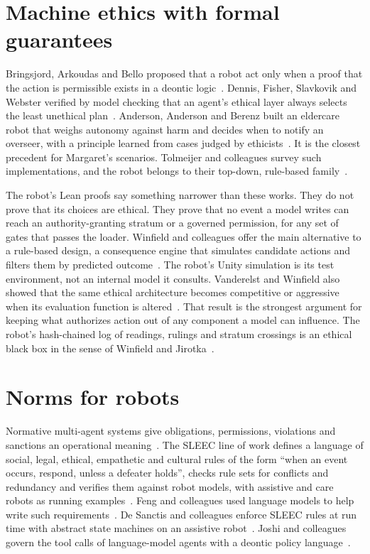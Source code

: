 \section{Machine ethics with formal guarantees}

Bringsjord, Arkoudas and Bello proposed that a robot act only when a proof that the action is
permissible exists in a deontic logic~\cite{bringsjord2006toward}. Dennis, Fisher, Slavkovik and
Webster verified by model checking that an agent's ethical layer always selects the least
unethical plan~\cite{dennis2016formal,dennis2016practical}. Anderson, Anderson and Berenz built an
eldercare robot that weighs autonomy against harm and decides when to notify an overseer, with a
principle learned from cases judged by ethicists~\cite{anderson2019eldercare}. It is the closest
precedent for Margaret's scenarios. Tolmeijer and colleagues survey such implementations, and the
robot belongs to their top-down, rule-based family~\cite{tolmeijer2021implementations}.

The robot's Lean proofs say something narrower than these works. They do not prove that its choices
are ethical. They prove that no event a model writes can reach an authority-granting stratum or a
governed permission, for any set of gates that passes the loader. Winfield and colleagues offer the
main alternative to a rule-based design, a consequence engine that simulates candidate actions and
filters them by predicted outcome~\cite{winfield2014towards,vanderelst2018architecture}. The
robot's Unity simulation is its test environment, not an internal model it consults. Vanderelst
and Winfield also showed that the same ethical architecture becomes competitive or aggressive when
its evaluation function is altered~\cite{vanderelst2018darkside}. That result is the strongest
argument for keeping what authorizes action out of any component a model can influence. The
robot's hash-chained log of readings, rulings and stratum crossings is an ethical black box in the
sense of Winfield and Jirotka~\cite{winfield2017ebb,winfield2022ebbstandard,winfield2018governance}.

\section{Norms for robots}

Normative multi-agent systems give obligations, permissions, violations and sanctions an
operational meaning~\cite{boella2006normative}. The SLEEC line of work defines a language of
social, legal, ethical, empathetic and cultural rules of the form ``when an event occurs, respond,
unless a defeater holds'', checks rule sets for conflicts and redundancy and verifies them against
robot models, with assistive and care robots as running
examples~\cite{getiryaman2023sleec,getiryaman2024sleectoolkit,getiryaman2025sleecjss,ribeiro2026sleecframework}.
Feng and colleagues used language models to help write such requirements~\cite{feng2024normative}.
De Sanctis and colleagues enforce SLEEC rules at run time with abstract state machines on an
assistive robot~\cite{desanctis2026sleecruntime}. Joshi and colleagues govern the tool calls of
language-model agents with a deontic policy language~\cite{joshi2026deontic}.

